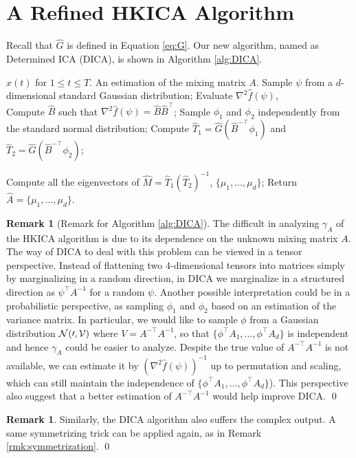 \documentclass[twoside]{article}
\newcommand{\cN}{\cal{N}}
\theoremstyle{definition}
\newtheorem{remark}[lemma]{Remark}
\begin{document}
\section{A Refined HKICA Algorithm}
\label{sec:DICA}
Recall that $\widehat{G}$ is defined in Equation \eqref{eq:G}.
Our new algorithm, named as Determined ICA (DICA), is shown in Algorithm \ref{alg:DICA}. 
\begin{algorithm}
\caption{Determined ICA (DICA)}
\label{alg:DICA}
\begin{algorithmic}[1]
\INPUT $x(t)$ for $1\le t \le T$. 
\OUTPUT An estimation of the mixing matrix $A$. 
\STATE Sample $\psi$ from a $d$-dimensional standard Gaussian distribution;
\STATE Evaluate $\nabla^2\widehat{f}(\psi)$, \\
\STATE Compute $\widehat{B}$ such that $\nabla^2\widehat{f}(\psi) = \widehat{B}\widehat{B}^{\top}$;
\STATE Sample $\phi_1$ and $\phi_2$ independently from the standard normal distribution;
\STATE Compute $\widehat{T}_1 = \widehat{G}(\widehat{B}^{-\top}\phi_1)$ and  $\widehat{T}_2 =\widehat{G}(\widehat{B}^{-\top}\phi_2)$;

\STATE Compute all the eigenvectors of $\widehat{M} = \widehat{T}_1\left(\widehat{T}_2\right)^{-1}$, $\{\mu_1,\ldots,\mu_d\}$;
\STATE Return $\widehat{A} = \{\mu_1,\ldots,\mu_d\}$.
\end{algorithmic}
\end{algorithm}
\begin{remark}[Remark for Algorithm \ref{alg:DICA}]
The difficult in analyzing $\gamma_A$ of the HKICA algorithm is due to its dependence on the unknown mixing matrix $A$. 
The way of DICA to deal with this problem can be viewed in a tensor perspective. 
Instead of flattening two $4$-dimensional tensors into matrices simply by marginalizing in a random direction, in DICA we marginalize in a structured direction as $\psi^{\top}A^{-1}$ for a random $\psi$. 
Another possible interpretation could be in a  probabilistic perspective, as sampling $\phi_1$ and $\phi_2$ based on an estimation of the variance matrix. 
In particular, we would like to sample $\phi$ from a Gaussian distribution $\cN(0,V)$ where $V = A^{-\top}A^{-1}$, so that $\{\phi^{\top}A_1, \ldots, \phi^{\top}A_d \}$ is independent and hence $\gamma_A$ could be easier to analyze. 
Despite the true value of $A^{-\top}A^{-1}$ is not available, we can estimate it by $\left(\nabla^2\widehat{f}(\psi)\right)^{-1}$ up to permutation and scaling,
which can still maintain the independence of $\{\phi^{\top}A_1, \ldots, \phi^{\top}A_d \}$). 
This perspective also suggest that a better estimation of $A^{-\top}A^{-1}$ would help improve DICA. \qed
\end{remark}
\begin{remark}
Similarly, the DICA algorithm also suffers the complex output. 
A same symmetrizing trick can be applied again, as in Remark \ref{rmk:symmetrization}. \qed 
\end{remark}
\end{document}
